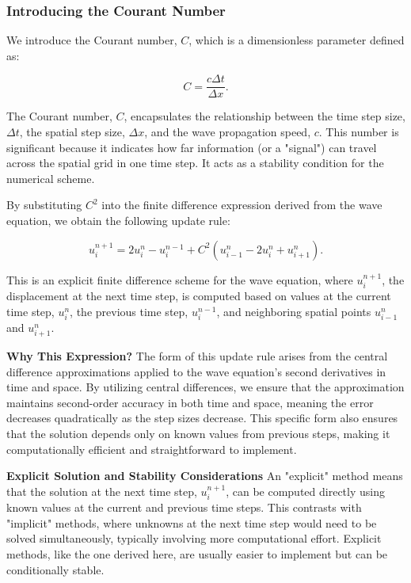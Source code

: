 \documentclass{article}
\begin{document}
			\subsubsection{Introducing the Courant Number}
			
			We introduce the Courant number, $C$, which is a dimensionless parameter defined as:
			
			\begin{equation}
				C = \frac{c \Delta t}{\Delta x}.
			\end{equation}
			
			The Courant number, $C$, encapsulates the relationship between the time step size, $\Delta t$, the spatial step size, $\Delta x$, and the wave propagation speed, $c$. This number is significant because it indicates how far information (or a "signal") can travel across the spatial grid in one time step. It acts as a stability condition for the numerical scheme.
			
			By substituting $C^2$ into the finite difference expression derived from the wave equation, we obtain the following update rule:
			
			\begin{equation}
				u_i^{n+1} = 2u_i^n - u_i^{n-1} + C^2 \left( u_{i-1}^n - 2u_i^n + u_{i+1}^n \right).
			\end{equation}
			
			This is an explicit finite difference scheme for the wave equation, where $u_i^{n+1}$, the displacement at the next time step, is computed based on values at the current time step, $u_i^n$, the previous time step, $u_i^{n-1}$, and neighboring spatial points $u_{i-1}^n$ and $u_{i+1}^n$.
			
			\textbf{Why This Expression?} The form of this update rule arises from the central difference approximations applied to the wave equation's second derivatives in time and space. By utilizing central differences, we ensure that the approximation maintains second-order accuracy in both time and space, meaning the error decreases quadratically as the step sizes decrease. This specific form also ensures that the solution depends only on known values from previous steps, making it computationally efficient and straightforward to implement.
			
			\textbf{Explicit Solution and Stability Considerations} An "explicit" method means that the solution at the next time step, $u_i^{n+1}$, can be computed directly using known values at the current and previous time steps. This contrasts with "implicit" methods, where unknowns at the next time step would need to be solved simultaneously, typically involving more computational effort. Explicit methods, like the one derived here, are usually easier to implement but can be conditionally stable.
			
\end{document}
